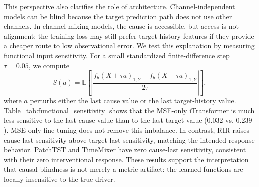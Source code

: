 \documentclass{article}
\begin{document}
This perspective also clarifies the role of architecture. Channel-independent models
can be blind because the target prediction path does not use other channels. In
channel-mixing models, the cause is accessible, but access is not alignment: the
training loss may still prefer target-history features if they provide a cheaper
route to low observational error. We test this explanation by measuring functional
input sensitivity. For a small standardized finite-difference step $\tau=0.05$, we compute
\begin{equation}
S(a)=
\mathbb{E}\left[
\left|
\frac{f_\theta(X+\tau a)_{1,Y}-f_\theta(X-\tau a)_{1,Y}}{2\tau}
\right|
\right],
\end{equation}
where $a$ perturbs either the last cause value or the last target-history value.
Table~\ref{tab:functional_sensitivity} shows that the MSE-only iTransformer is much
less sensitive to the last cause value than to the last target value
($0.032$ vs. $0.239$). MSE-only fine-tuning does not remove this imbalance. In
contrast, RIR raises cause-last sensitivity above target-last sensitivity, matching
the intended response behavior. PatchTST and TimeMixer have zero cause-last
sensitivity, consistent with their zero interventional response. These results
support the interpretation that causal blindness is not merely a metric artifact:
the learned functions are locally insensitive to the true driver.

\begin{table}[t]
\centering
\caption{Functional input sensitivity of the horizon-1 target prediction, measured
by central differences with $\tau=0.05$ over 32 test batches. MSE-only models are
far more sensitive to target history than to the true last-step cause. RIR changes
the local response geometry of iTransformer.}
\label{tab:functional_sensitivity}
\end{table}
\end{document}
